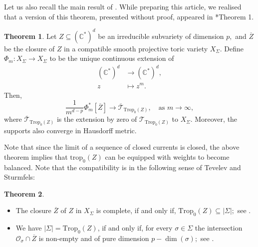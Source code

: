 \documentclass[11pt]{amsart}
\theoremstyle{definition}
\newtheorem{theorem}{Theorem}[section]
\newcommand{\lmto}{\longmapsto}
\newcommand{\CC}{\mathbb{C}}
\newcommand{\C}{\mathbb{C}}
\newcommand{\trop}{\mathrm{trop}}
\newcommand{\cO}{\mathcal{O}}
\newcommand{\Trop}{\mathrm{Trop}}
\begin{document}
Let us also recall the main result of \cite{Dyn-trop}. While preparing this article, we realised that a version of this theorem, presented without proof, appeared in \cite{Kazarnovski}*{Theorem 1}.

\begin{theorem}\label{thm:dyn_trop_toric}
 Let $Z\subseteq (\CC^*)^d$ be an irreducible subvariety of dimension $p,$ and $\overline{Z}$ be the closure of $Z$ in a compatible smooth projective toric variety $X_{\Sigma}$. Define $\Phi_m: X_{\Sigma}\longrightarrow X_{\Sigma}$ to be the unique continuous extension of 
\begin{align*}
    (\C^*)^d & \longrightarrow (\C^*)^d, \\
    z &\lmto z^m.
\end{align*}
Then,
$$
\frac{1}{m^{d-p}}\Phi_m^*[\overline{Z}] \longrightarrow \overline{\mathscr{T}}_{\Trop_0(Z)}, \quad \text{as $m\to \infty$},
$$
where  $\overline{\mathscr{T}}_{\Trop_0(Z)}$ is the extension by zero of $\mathscr{T}_{\Trop_0(Z)}$ to $X_{\Sigma}.$ Moreover, the supports also converge in Hausdorff metric. 
\end{theorem}

Note that since the limit of a sequence of closed currents is closed, the above theorem implies that $\trop_0(Z)$ can be equipped with weights to become balanced. Note that the compatibility is in the following sense of Tevelev and Sturmfels: 
\begin{theorem}
\begin{itemize}
  \item [(a)]  The closure $\overline{Z}$ of $Z$ in $X_{\Sigma}$ is complete, if and only if, $\Trop_0(Z) \subseteq |\Sigma|;$ see \cite{Tevelev}. 
  \item [(b)] We have $|\Sigma|= \Trop_0(Z)$, if and only if, for every $\sigma \in \Sigma$ the intersection $ \cO_{\sigma}\cap \overline{Z}$ is non-empty and of pure dimension $p- \dim(\sigma);$ see \cite{Sturmfels-Tevelev}.
\end{itemize}
\end{theorem}
\end{document}
